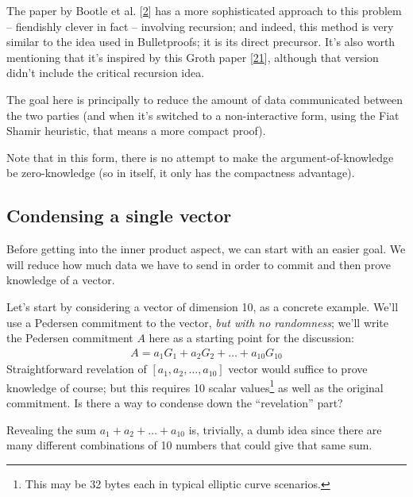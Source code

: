 \documentclass[10pt,a4paper]{article}
\begin{document}
The paper by Bootle et al. {[}\protect\hyperlink{anchor-8}{2}{]} has a
more sophisticated approach to this problem -- fiendishly clever in fact
-- involving recursion; and indeed, this method is very similar to the
idea used in Bulletproofs; it is its direct precursor. It's also worth
mentioning that it's inspired by this Groth paper
{[}\protect\hyperlink{anchor-42}{21}{]}, although that version didn't
include the critical recursion idea.

The goal here is principally to reduce the amount of data communicated
between the two parties (and when it's switched to a non-interactive
form, using the Fiat Shamir heuristic, that means a more compact proof).

Note that in this form, there is no attempt to make the
argument-of-knowledge be zero-knowledge (so in itself, it only has the
compactness advantage).

\hypertarget{condensing-a-single-vector}{%
\subsection[Condensing a single
vector]{\texorpdfstring{\protect\hypertarget{anchor-43}{}{}Condensing a
single
vector}{Condensing a single vector}}\label{condensing-a-single-vector}}

Before getting into the inner product aspect, we can start with an easier goal. 
We will reduce how much data we have to send in order to
commit and then prove knowledge of a vector. 

Let's start by considering a vector of dimension 10, as a concrete example. We'll use a Pedersen
commitment to the vector, \emph{but with no randomness}; we'll write the Pedersen commitment $A$
here as a starting point for the discussion:
\begin{align}
A = a_1 G_1 + a_2 G_2 + \ldots + a_{10} G_{10} \label{condensing-vector-def:1}
\end{align}
Straightforward revelation of $[a_{1}, a_{2}, \ldots , a_{10}]$ vector would suffice to 
prove knowledge of course; but this requires 10 scalar values\footnote{This may be 32 bytes each in
typical elliptic curve scenarios.} as well as the original commitment. Is
there a way to condense down the ``revelation'' part?

Revealing the sum $a_1 + a_2 + \ldots + a_{10}$ is, trivially, a dumb idea since there are many
different combinations of 10 numbers that could give that same sum.
\end{document}
